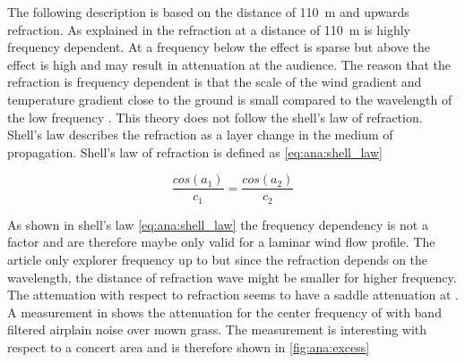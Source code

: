 

The following description is based on the distance of \SI{110}{\meter} and upwards refraction. As explained in \citep{review_of_sound} the refraction at a distance of \SI{110}{\meter} is highly frequency dependent. At a frequency below  the effect is sparse but above the effect is high and may result in  attenuation at the audience. The reason that the refraction is frequency dependent is that the scale of the wind gradient and temperature gradient close to the ground is small compared to the wavelength of the low frequency \citep{review_of_sound}. This theory does not follow the shell's law of refraction. Shell's law describes the refraction as a layer change in the medium of propagation. Shell's law of refraction is defined as \autoref{eq:ana:shell_law}

\begin{equation}\label{eq:ana:shell_law}
\frac{cos(a_1)}{c_1} = \frac{cos(a_2)}{c_2}
\end{equation}

\startexplain
{}
\stopexplain

As shown in shell's law \autoref{eq:ana:shell_law} the frequency dependency is not a factor and are therefore maybe only valid for a laminar wind flow profile. The article \citep{review_of_sound} only explorer frequency up to  but since the refraction depends on the wavelength, the distance of refraction wave might be smaller for higher frequency. The attenuation with respect to refraction seems to have a saddle attenuation at . A measurement in \citep{review_of_sound} shows the attenuation for the center frequency of  with  band filtered airplain noise over mown grass. The measurement is interesting with respect to a concert area and is therefore shown in \autoref{fig:ana:excess} 



